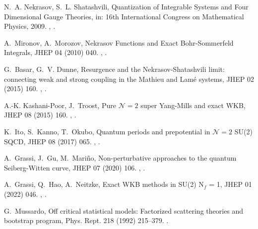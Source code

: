 \documentclass[11pt,a4paper]{elsarticle}
\numberwithin{figure}{section}
\numberwithin{table}{section}
\begin{document}
\begin{thebibliography}{10}
N.~A. Nekrasov, S.~L. Shatashvili, {Quantization of Integrable Systems and Four
  Dimensional Gauge Theories}, in: {16th International Congress on Mathematical
  Physics}, 2009.
\newblock \href {http://arxiv.org/abs/0908.4052} {},
  \href {https://doi.org/10.1142/9789814304634_0015}
  {}.

A.~Mironov, A.~Morozov, {Nekrasov Functions and Exact Bohr-Sommerfeld
  Integrals}, JHEP 04 (2010) 040.
\newblock \href {http://arxiv.org/abs/0910.5670} {},
  \href {https://doi.org/10.1007/JHEP04(2010)040}
  {}.

G.~Basar, G.~V. Dunne, {Resurgence and the Nekrasov-Shatashvili limit:
  connecting weak and strong coupling in the Mathieu and Lamé systems}, JHEP
  02 (2015) 160.
\newblock \href {http://arxiv.org/abs/1501.05671} {},
  \href {https://doi.org/10.1007/JHEP02(2015)160}
  {}.

A.-K. Kashani-Poor, J.~Troost, {Pure $ \mathcal{N}=2 $ super Yang-Mills and
  exact WKB}, JHEP 08 (2015) 160.
\newblock \href {http://arxiv.org/abs/1504.08324} {},
  \href {https://doi.org/10.1007/JHEP08(2015)160}
  {}.

K.~Ito, S.~Kanno, T.~Okubo, {Quantum periods and prepotential in $
  \mathcal{N}=2 $ SU(2) SQCD}, JHEP 08 (2017) 065.
\newblock \href {http://arxiv.org/abs/1705.09120} {},
  \href {https://doi.org/10.1007/JHEP08(2017)065}
  {}.

A.~Grassi, J.~Gu, M.~Mari\~no, {Non-perturbative approaches to the quantum
  Seiberg-Witten curve}, JHEP 07 (2020) 106.
\newblock \href {http://arxiv.org/abs/1908.07065} {},
  \href {https://doi.org/10.1007/JHEP07(2020)106}
  {}.

A.~Grassi, Q.~Hao, A.~Neitzke, {Exact WKB methods in SU(2) N$_{f}$ = 1}, JHEP
  01 (2022) 046.
\newblock \href {http://arxiv.org/abs/2105.03777} {},
  \href {https://doi.org/10.1007/JHEP01(2022)046}
  {}.

G.~Mussardo, {Off critical statistical models: Factorized scattering theories
  and bootstrap program}, Phys. Rept. 218 (1992) 215--379.
\newblock \href {https://doi.org/10.1016/0370-1573(92)90047-4}
  {}.


\end{thebibliography}
\end{document}
